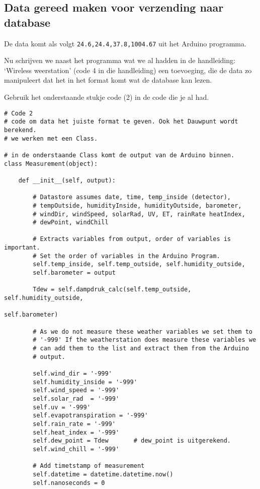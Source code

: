 \subsection{Data gereed maken voor verzending naar database}

De data komt als volgt \verb|24.6,24.4,37.8,1004.67| uit het Arduino programma.

Nu schrijven we naast het programma wat we al hadden in de handleiding: `Wireless
weerstation' (code 4 in die handleiding) een toevoeging, die de data zo manipuleert dat het in het 
format komt wat de \hisparc database kan lezen.

Gebruik het onderstaande stukje code (2) in de code die je al had.

\begin{verbatim}
# Code 2
# code om data het juiste format te geven. Ook het Dauwpunt wordt berekend.
# we werken met een Class.

# in de onderstaande Class komt de output van de Arduino binnen.
class Measurement(object):

    def __init__(self, output):

        # Datastore assumes date, time, temp_inside (detector),
        # tempOutside, humidityInside, humidityOutside, barometer,
        # windDir, windSpeed, solarRad, UV, ET, rainRate heatIndex,
        # dewPoint, windChill

        # Extracts variables from output, order of variables is important.
        # Set the order of variables in the Arduino Program.
        self.temp_inside, self.temp_outside, self.humidity_outside, 
        self.barometer = output

        Tdew = self.dampdruk_calc(self.temp_outside, self.humidity_outside, 
                                                            self.barometer)

        # As we do not measure these weather variables we set them to
        # '-999' If the weatherstation does measure these variables we
        # can add them to the list and extract them from the Arduino
        # output.

        self.wind_dir = '-999'
        self.humidity_inside = '-999'
        self.wind_speed = '-999'
        self.solar_rad  = '-999'
        self.uv = '-999'
        self.evapotranspiration = '-999'
        self.rain_rate = '-999'
        self.heat_index = '-999'
        self.dew_point = Tdew       # dew_point is uitgerekend.
        self.wind_chill = '-999'

        # Add timetstamp of measurement
        self.datetime = datetime.datetime.now()
        self.nanoseconds = 0



\end{verbatim}
